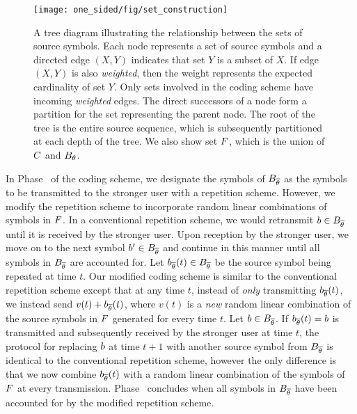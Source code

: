 \begin{figure}
	\centering
%	
	\texttt{[image: one\_sided/fig/set\_construction]}
	\caption{A tree diagram illustrating the relationship between the sets of source symbols.  Each node represents a set of source symbols and a directed edge $(X,Y)$ indicates that set $Y$ is a subset of $X$.  If edge $(X, Y)$ is also \emph{weighted}, then the weight represents the expected cardinality of set $Y$.  Only sets involved in the coding scheme have incoming \emph{weighted} edges.  The direct successors of a node form a partition for the set representing the parent node.  The root of the tree is the entire source sequence, which is subsequently partitioned at each depth of the tree.  We also show set $F$, which is the union of $C$ and $B_{\theta}$.}
	\label{fig:set_construction}
\end{figure}

In Phase~ of the coding scheme, we designate the symbols of $B_{\overline{\theta}}$ as the symbols to be transmitted to the stronger user with a repetition scheme.  However, we modify the repetition scheme to incorporate random linear combinations of symbols in $F$.  In a conventional repetition scheme, we would retransmit $b \in B_{\overline{\theta}}$ until it is received by the stronger user.  Upon reception by the stronger user, we move on to the next symbol $b' \in B_{\overline{\theta}}$ and continue in this manner until all symbols in $B_{\overline{\theta}}$ are accounted for.  Let $b_{\overline{\theta}}(t) \in B_{\overline{\theta}}$ be the source symbol being repeated at time $t$.  Our modified coding scheme is similar to the conventional repetition scheme except that at any time $t$, instead of \emph{only} transmitting $b_{\overline{\theta}}(t)$, we instead send $v(t) + b_{\overline{\theta}}(t)$, where $v(t)$ is a \emph{new} random linear combination of the source symbols in $F$ generated for every time $t$.  Let  $b \in B_{\overline{\theta}}$.  If $b_{\overline{\theta}}(t) = b$ is transmitted and subsequently received by the stronger user at time $t$, the protocol for replacing $b$ at time $t+ 1$ with another source symbol from $B_{\overline{\theta}}$ is identical to the conventional repetition scheme, however the only difference is that we now combine $b_{\overline{\theta}}(t)$ with a random linear combination of the symbols of $F$ at every transmission.  Phase~ concludes when all symbols in $B_{\overline{\theta}}$ have been accounted for by the modified repetition scheme.

